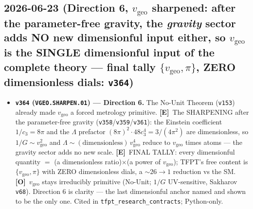\documentclass[11pt]{article}
\providecommand{\mE}{\textbf{[E]}}\providecommand{\mC}{\textbf{[C]}}
\providecommand{\mO}{\textbf{[O]}}\providecommand{\mX}{\textbf{[X]}}
\providecommand{\vref}[1]{\texttt{#1}}
\providecommand{\cthree}{c_3}\providecommand{\phiz}{\varphi_0^{\mathrm{ret}}}
\begin{document}
\subsection*{2026-06-23 (Direction 6, $v_{\mathrm{geo}}$ sharpened: after the parameter-free gravity, the \emph{gravity} sector adds NO new dimensionful input either, so $v_{\mathrm{geo}}$ is the SINGLE dimensionful input of the complete theory --- final tally $\{v_{\mathrm{geo}},\pi\}$, ZERO dimensionless dials: \texttt{v364})}
\begin{itemize}
\item \textbf{\texttt{v364} (\texttt{VGEO.SHARPEN.01}) --- Direction 6.} The No-Unit Theorem (\vref{v153}) already made
$v_{\mathrm{geo}}$ a forced metrology primitive. \mE\ The SHARPENING after the parameter-free gravity
(\vref{v358}/\vref{v359}/\vref{v361}): the Einstein coefficient $1/\cthree=8\pi$ and the $\Lambda$ prefactor
$(8\pi)^2{\cdot}48\cthree^4=3/(4\pi^2)$ are dimensionless, so $1/G\sim v_{\mathrm{geo}}^2$ and
$\Lambda\sim(\text{dimensionless})\,v_{\mathrm{geo}}^4$ reduce to $v_{\mathrm{geo}}$ times atoms --- the gravity sector
adds no new scale. \mE\ FINAL TALLY: every dimensionful quantity $=$ (a dimensionless ratio)$\times$(a power of
$v_{\mathrm{geo}}$); TFPT's free content is $\{v_{\mathrm{geo}},\pi\}$ with ZERO dimensionless dials, a ${\sim}26\to1$
reduction vs the SM. \mO\ $v_{\mathrm{geo}}$ stays irreducibly primitive (No-Unit; $1/G$ UV-sensitive, Sakharov
\vref{v68}). Direction 6 is clarity --- the last dimensionful anchor named and shown to be the only one. Cited in
\texttt{tfpt\_research\_contracts}; Python-only.
\end{itemize}
\end{document}
